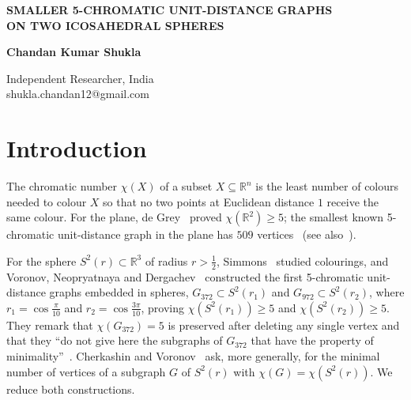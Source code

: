 \documentclass[11pt]{article}
\renewcommand{\_}{\textunderscore\allowbreak}
\theoremstyle{remark}
\begin{document}
\begin{center}
{\fontsize{14}{17}\selectfont\bfseries SMALLER 5-CHROMATIC UNIT-DISTANCE GRAPHS\\ ON TWO ICOSAHEDRAL SPHERES\par}
\vspace{6pt}
{\bfseries Chandan Kumar Shukla\par}
Independent Researcher, India\\ shukla.chandan12@gmail.com
\end{center}
\thispagestyle{empty}

\begin{abstract}
Voronov, Neopryatnaya and Dergachev constructed 5-chromatic unit-distance graphs on the sphere
$S^2(r_1)$, $r_1=\cos\frac{\pi}{10}$, with $372$ vertices, and on $S^2(r_2)$, $r_2=\cos\frac{3\pi}{10}$,
with $972$ vertices, and noted that the first graph stays 5-chromatic after deleting any single vertex. By
SAT-based vertex minimization we find a 5-chromatic subgraph of the first graph with $231$ vertices and
$938$ edges, and one of the second with $961$ vertices and $4028$ edges. Both are vertex-critical and
contain no Moser spindle; the smaller one is the best found by our search, not a proved minimum. All
coordinates are given exactly in nested radicals and verified in exact arithmetic;
non-4-colourability is certified by DRAT proofs checked with \textsc{drat-trim}.
\end{abstract}

\section{Introduction}

The chromatic number $\chi(X)$ of a subset $X\subseteq\mathbb{R}^n$ is the least number of colours needed
to colour $X$ so that no two points at Euclidean distance $1$ receive the same colour. For the plane, de
Grey~\cite{deGrey} proved $\chi(\mathbb{R}^2)\ge5$; the smallest known 5-chromatic unit-distance graph in
the plane has $509$ vertices~\cite{Parts1} (see also~\cite{Heule1}).

For the sphere $S^2(r)\subset\mathbb{R}^3$ of radius $r>\tfrac12$, Simmons~\cite{Simmons} studied
colourings, and Voronov, Neopryatnaya and Dergachev~\cite{VND2022} constructed the first 5-chromatic unit-distance
graphs embedded in spheres, $G_{372}\subset S^2(r_1)$ and $G_{972}\subset S^2(r_2)$, where
$r_1=\cos\frac{\pi}{10}$ and $r_2=\cos\frac{3\pi}{10}$, proving $\chi(S^2(r_1))\ge5$ and
$\chi(S^2(r_2))\ge5$. They remark that $\chi(G_{372})=5$ is preserved after deleting any single vertex
and that they ``do not give here the subgraphs of $G_{372}$ that have the property of
minimality''~\cite[Sect.~4]{VND2022}. Cherkashin and Voronov~\cite{CV2022} ask, more generally, for the
minimal number of vertices of a subgraph $G$ of $S^2(r)$ with $\chi(G)=\chi(S^2(r))$.
We reduce both constructions.
\end{document}
